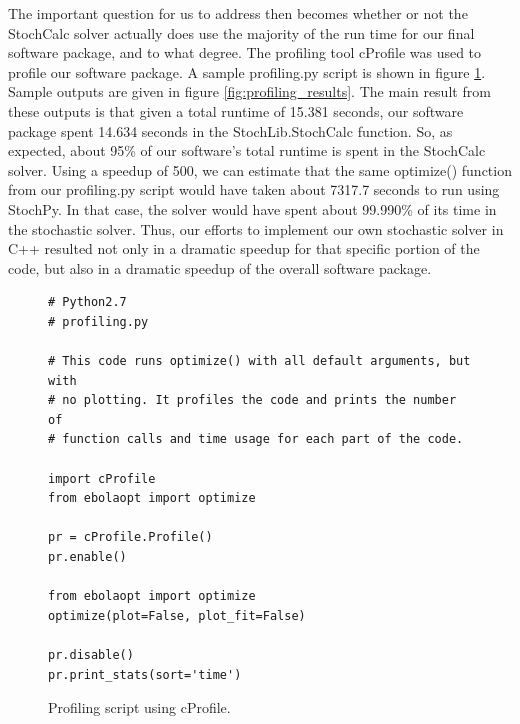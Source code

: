 \documentclass[11pt,letter]{article}
\begin{document}
The important question for us to address then becomes whether or not the StochCalc solver actually does use the majority of the run time for our final software package, and to what degree. The profiling tool cProfile was used to profile our software package. A sample profiling.py script is shown in figure \ref{fig:profiling}. Sample outputs are given in figure \ref{fig:profiling_results}. The main result from these outputs is that given a total runtime of 15.381 seconds, our software package spent 14.634 seconds in the StochLib.StochCalc function. So, as expected, about 95\% of our software's total runtime is spent in the StochCalc solver. Using a speedup of 500, we can estimate that the same optimize() function from our profiling.py script would have taken about 7317.7 seconds to run using StochPy. In that case, the solver would have spent about 99.990\% of its time in the stochastic solver. Thus, our efforts to implement our own stochastic solver in C++ resulted not only in a dramatic speedup for that specific portion of the code, but also in a dramatic speedup of the overall software package.\\
\begin{figure}
\begin{lstlisting}
# Python2.7
# profiling.py

# This code runs optimize() with all default arguments, but with
# no plotting. It profiles the code and prints the number of
# function calls and time usage for each part of the code.

import cProfile
from ebolaopt import optimize

pr = cProfile.Profile()
pr.enable()

from ebolaopt import optimize
optimize(plot=False, plot_fit=False)

pr.disable()
pr.print_stats(sort='time')
\end{lstlisting}
\caption{Profiling script using cProfile.}
\label{fig:profiling}
\end{figure}
\end{document}
